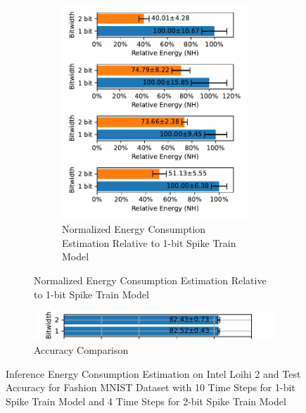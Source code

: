 \begin{figure}[!htpb]
\begin{subfigure}[H]{\textwidth}
\begin{subfigure}[H]{0.49\textwidth}
                    \includegraphics[width=\textwidth]{../timesteps/FashionMNIST/plots/fashionmnist_test_relative_energy_nh.pdf}
                    \caption{Normalized Energy Consumption Estimation Relative to 1-bit Spike Train Model}
                \end{subfigure}
            \end{subfigure}
            \hfill
            \begin{subfigure}[H]{\textwidth}
                \centering
                \includegraphics[width=\textwidth]{../timesteps/FashionMNIST/plots/fashionmnist_final_acc_horizontal.pdf}
                \caption{Accuracy Comparison}
            \end{subfigure}
            \caption{Inference Energy Consumption Estimation on Intel Loihi 2 and Test Accuracy for Fashion MNIST Dataset with 10 Time Steps for 1-bit Spike Train Model and 4 Time Steps for 2-bit Spike Train Model}
            \label{fig:inference_energy_nh_timesteps}
        \end{figure}
        
